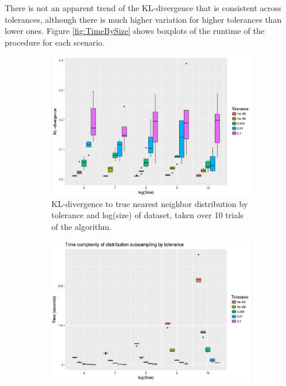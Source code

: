 \documentclass{article}
\begin{document}
There is not an apparent trend of the KL-divergence that is consistent across tolerances, although there is much higher variation for higher tolerances than lower ones.
Figure \ref{fig:TimeBySize} shows boxplots of the runtime of the procedure for each scenario.
\begin{figure}
	\begin{subfigure}{0.5\textwidth}
    	\includegraphics[width=\linewidth]{Figures/NearestNeighbor/div_by_size_and_tol_cdr3.png}
    	\caption{KL-divergence to true nearest neighbor distribution by tolerance and log(size) of dataset, taken over 10 trials of the algorithm.}
    	\label{fig:DivBySize}
	\end{subfigure}
	\begin{subfigure}{0.5\textwidth}
    	\includegraphics[width=\linewidth]{Figures/NearestNeighbor/time_by_size_and_tol_cdr3.png}

\end{subfigure}
\end{figure}
\end{document}
